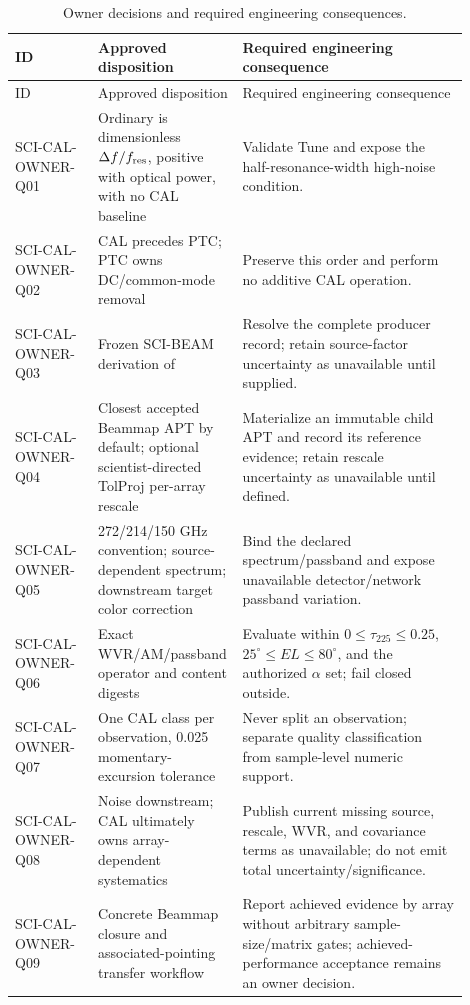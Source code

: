 \documentclass[10pt]{article}
\begin{document}
\begin{longtable}{L{0.18\linewidth}L{0.23\linewidth}L{0.49\linewidth}}
\caption{Owner decisions and required engineering consequences.}
\label{tab:eng-owner-gates}\\
\toprule
ID & Approved disposition & Required engineering consequence \\
\midrule
\endfirsthead
\toprule
ID & Approved disposition & Required engineering consequence \\
\midrule
\endhead
SCI-CAL-OWNER-Q01 & Ordinary  is dimensionless \(\Delta f/f_{\rm res}\), positive with optical power, with no CAL baseline & Validate Tune and expose the half-resonance-width high-noise condition. \\
SCI-CAL-OWNER-Q02 & CAL precedes PTC; PTC owns DC/common-mode removal & Preserve this order and perform no additive CAL operation. \\
SCI-CAL-OWNER-Q03 & Frozen SCI-BEAM derivation of  & Resolve the complete producer record; retain source-factor uncertainty as unavailable until supplied. \\
SCI-CAL-OWNER-Q04 & Closest accepted Beammap APT by default; optional scientist-directed TolProj per-array rescale & Materialize an immutable child APT and record its reference evidence; retain rescale uncertainty as unavailable until defined. \\
SCI-CAL-OWNER-Q05 & 272/214/150 GHz convention; source-dependent spectrum; downstream target color correction & Bind the declared spectrum/passband and expose unavailable detector/network passband variation. \\
SCI-CAL-OWNER-Q06 & Exact WVR/AM/passband operator and content digests & Evaluate within \(0\le\tau_{225}\le0.25\), \(25^\circ\le EL\le80^\circ\), and the authorized \(\alpha\) set; fail closed outside. \\
SCI-CAL-OWNER-Q07 & One CAL class per observation, 0.025 momentary-excursion tolerance & Never split an observation; separate quality classification from sample-level numeric support. \\
SCI-CAL-OWNER-Q08 & Noise downstream; CAL ultimately owns array-dependent systematics & Publish current missing source, rescale, WVR, and covariance terms as unavailable; do not emit total uncertainty/significance. \\
SCI-CAL-OWNER-Q09 & Concrete Beammap closure and associated-pointing transfer workflow & Report achieved evidence by array without arbitrary sample-size/matrix gates; achieved-performance acceptance remains an owner decision. \\
\bottomrule
\end{longtable}
\end{document}
